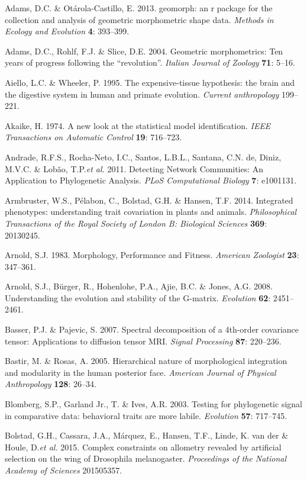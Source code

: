 \documentclass[12pt,twoside]{report}
\begin{document}
Adams, D.C. \& Otárola-Castillo, E. 2013. geomorph: an r package for the
collection and analysis of geometric morphometric shape data.
\emph{Methods in Ecology and Evolution} \textbf{4}: 393--399.

Adams, D.C., Rohlf, F.J. \& Slice, D.E. 2004. Geometric morphometrics:
Ten years of progress following the ``revolution''. \emph{Italian
Journal of Zoology} \textbf{71}: 5--16.

Aiello, L.C. \& Wheeler, P. 1995. The expensive-tissue hypothesis: the
brain and the digestive system in human and primate evolution.
\emph{Current anthropology} 199--221.

Akaike, H. 1974. A new look at the statistical model identification.
\emph{IEEE Transactions on Automatic Control} \textbf{19}: 716--723.

Andrade, R.F.S., Rocha-Neto, I.C., Santos, L.B.L., Santana, C.N. de,
Diniz, M.V.C. \& Lobão, T.P.\emph{et al.} 2011. Detecting Network
Communities: An Application to Phylogenetic Analysis. \emph{PLoS
Computational Biology} \textbf{7}: e1001131.

Armbruster, W.S., Pélabon, C., Bolstad, G.H. \& Hansen, T.F. 2014.
Integrated phenotypes: understanding trait covariation in plants and
animals. \emph{Philosophical Transactions of the Royal Society of London
B: Biological Sciences} \textbf{369}: 20130245.

Arnold, S.J. 1983. Morphology, Performance and Fitness. \emph{American
Zoologist} \textbf{23}: 347--361.

Arnold, S.J., Bürger, R., Hohenlohe, P.A., Ajie, B.C. \& Jones, A.G.
2008. Understanding the evolution and stability of the G-matrix.
\emph{Evolution} \textbf{62}: 2451--2461.

Basser, P.J. \& Pajevic, S. 2007. Spectral decomposition of a 4th-order
covariance tensor: Applications to diffusion tensor MRI. \emph{Signal
Processing} \textbf{87}: 220--236.

Bastir, M. \& Rosas, A. 2005. Hierarchical nature of morphological
integration and modularity in the human posterior face. \emph{American
Journal of Physical Anthropology} \textbf{128}: 26--34.

Blomberg, S.P., Garland Jr., T. \& Ives, A.R. 2003. Testing for
phylogenetic signal in comparative data: behavioral traits are more
labile. \emph{Evolution} \textbf{57}: 717--745.

Bolstad, G.H., Cassara, J.A., Márquez, E., Hansen, T.F., Linde, K. van
der \& Houle, D.\emph{et al.} 2015. Complex constraints on allometry
revealed by artificial selection on the wing of Drosophila melanogaster.
\emph{Proceedings of the National Academy of Sciences} 201505357.
\end{document}
